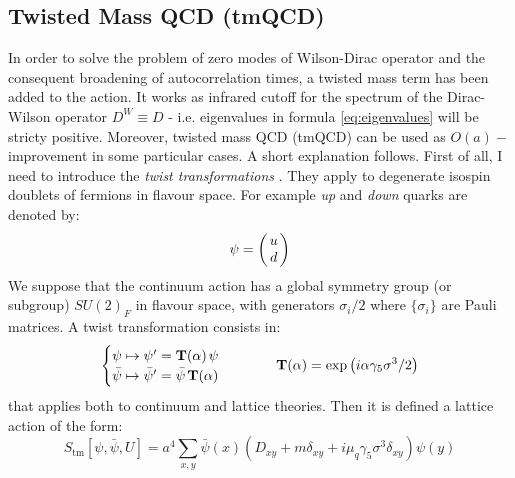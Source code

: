 \documentclass[english, LaM, oneside, noexaminfo]{sapthesis}
\begin{document}
\subsection{Twisted Mass QCD (tmQCD)}\label{sec:tmLQCD}
\noindent
In order to solve the problem of zero modes of Wilson-Dirac operator and the consequent broadening of autocorrelation times, a twisted mass term has been added to the action.
It works as infrared cutoff for the spectrum of the Dirac-Wilson operator $D^W \equiv D$ - i.e. eigenvalues in formula \ref{eq:eigenvalues} will be stricty positive.
Moreover, twisted mass QCD (tmQCD) can be used as $O(a)-$improvement in some particular cases.
A short explanation follows.
\newline
First of all, I need to introduce the \textit{twist transformations} \cite{tmLQCD}.
They apply to degenerate isospin doublets of fermions in flavour space.
For example \textit{up} and \textit{down} quarks are denoted by:
\begin{equation*}
    \psi =
    \begin{pmatrix}
        \hspace*{0.5mm}u\hspace*{0.5mm} \\ \hspace*{0.5mm}d\hspace*{0.5mm}
    \end{pmatrix}
\end{equation*}
We suppose that the continuum action has a global symmetry group (or subgroup) $SU(2)_F$ in flavour space, with generators $\sigma_i/2$ where $\{\sigma_i\}$ are Pauli matrices.
A twist transformation consists in:
\begin{equation}\label{eq:twist}
    \begin{cases}
        \psi \mapsto \psi' = \mathbf{T}(\alpha) \hspace*{0.5mm} \psi \\
        \bar \psi \mapsto \bar \psi' = \bar \psi \hspace*{0.5mm} \mathbf{T}(\alpha) 
    \end{cases}
    \hspace*{1cm}
    \mathbf{T}(\alpha) = \text{exp}\left(i\alpha \gamma_5 \sigma^3/2\right)
\end{equation}
that applies both to continuum and lattice theories.
Then it is defined a lattice action of the form:
\begin{equation}\label{eq:tmQCD-action}
    S_\text{tm}[\psi,\bar \psi, U] = a^4 \sum_{x,y} \bar \psi(x) \left( D_{xy} + m \delta_{xy} + i \mu_q \gamma_5 \sigma^3 \delta_{xy} \right) \psi (y)
\end{equation}
\end{document}
